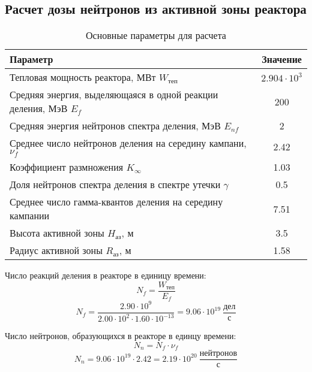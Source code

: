 \subsection{Расчет дозы нейтронов из активной зоны реактора}


\begin{table}[H]
	\caption{Основные параметры для расчета}
	\begin{center}
        \begin{tabular}{|l|c|}
        \toprule
         Параметр & Значение \\ 
         \midrule
         \hline
         Тепловая мощность реактора, МВт $W_{\text{теп}}$ & $2.904 \cdot 10^3$ \\ 
         \hline
         Средняя энергия, выделяющаяся в одной реакции деления, МэВ $E_f$ & 200  \\ 
         \hline
         Средняя энергия нейтронов спектра деления, МэВ $E_{nf}$ & 2 \\
         \hline
         Среднее число нейтронов деления на середину кампани, $\nu_f$ & 2.42 \\
         \hline
         Коэффициент размножения $K_\infty$ & 1.03  \\
         \hline
         Доля нейтронов спектра деления в спектре утечки $\gamma$ & 0.5 \\
         \hline
         Среднее число гамма-квантов деления на середину кампании & 7.51 \\
         \hline
         Высота активной зоны $H_{\text{аз}}$, м & 3.5 \\
         \hline
         Радиус активной зоны $R_{\text{аз}}$, м & 1.58 \\
         \bottomrule
		\end{tabular}
		\label{tabular:bio_sec_in}
	\end{center}
\end{table}


\noindent Число реакций деления в реакторе в единицу времени:
\begin{equation}
        N_f = \frac
               { W_{ \text{теп} } }
                   { E_f  }
\end{equation}
$$
       N_f = \frac
                     { 2.90 \cdot 10^{{ 9 }} }
    { 2.00 \cdot 10^{{ 2 }} \cdot 1.60 \cdot 10^{{ -13 }} }
= 9.06 \cdot 10^{{ 19 }}
\ \frac{\text{дел} } {\text{с} }
$$

\noindent Число нейтронов, образующихся в реакторе в единцу времени:
\begin{equation}
        N_n = N_f \cdot \nu_f
\end{equation}
$$
        N_n = 9.06 \cdot 10^{{ 19 }} \cdot 2.42  = 2.19 \cdot 10^{{ 20 }} \ \frac{нейтронов} {с}
$$

